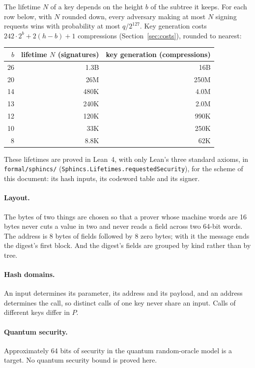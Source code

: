 \documentclass[11pt]{article}
\theoremstyle{plain}
\theoremstyle{definition}
\begin{document}
The lifetime $N$ of a key depends on the height $b$ of the subtree it keeps. For each row below, with $N$ rounded down, every adversary making at most $N$ signing requests wins with probability at most $q/2^{127}$. Key generation costs $242\cdot2^b+2(h-b)+1$ compressions (Section~\ref{sec:costs}), rounded to nearest:
\begin{center}
\begin{tabular}{@{}rrr@{}}
\toprule
$b$ & lifetime $N$ (signatures) & key generation (compressions)\\
\midrule
26 & 1.3B & 16B\\
20 & 26M & 250M\\
14 & 480K & 4.0M\\
13 & 240K & 2.0M\\
12 & 120K & 990K\\
10 & 33K & 250K\\
8 & 8.8K & 62K\\
\bottomrule
\end{tabular}
\end{center}
These lifetimes are proved in Lean~4, with only Lean's three standard axioms, in \texttt{formal/sphincs/} (\texttt{Sphincs.Lifetimes.requestedSecurity}), for the scheme of this document: its hash inputs, its codeword table and its signer.

\paragraph{Layout.}
\label{sec:layout}
The bytes of two things are chosen so that a prover whose machine words are 16 bytes never cuts a value in two and never reads a field across two 64-bit words. The address is 8 bytes of fields followed by 8 zero bytes; with it the message ends the digest's first block. And the digest's fields are grouped by kind rather than by tree.

\paragraph{Hash domains.}
An input determines its parameter, its address and its payload, and an address determines the call, so distinct calls of one key never share an input. Calls of different keys differ in $P$.

\paragraph{Quantum security.}
\label{sec:quantum}
Approximately 64 bits of security in the quantum random-oracle model is a target. No quantum security bound is proved here.
\end{document}
